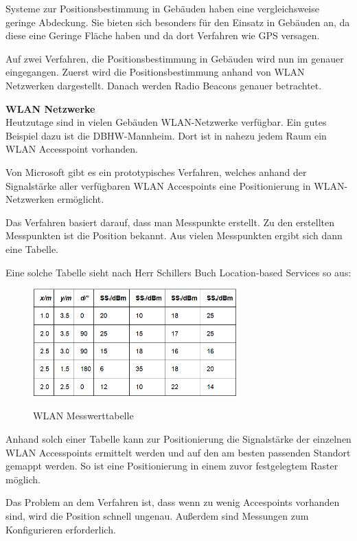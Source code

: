 Systeme zur Positionsbestimmung in Gebäuden haben eine vergleichsweise geringe Abdeckung. Sie bieten sich besonders für den Einsatz in Gebäuden an, da diese eine Geringe Fläche haben und  da dort Verfahren wie GPS versagen. 

Auf zwei Verfahren, die Positionsbestimmung in Gebäuden wird nun im genauer eingegangen. Zuerst wird die Positionsbestimmung anhand von WLAN Netzwerken dargestellt. Danach werden Radio Beacons genauer betrachtet.

\textbf{WLAN Netzwerke}\\
Heutzutage sind in vielen Gebäuden WLAN-Netzwerke verfügbar. Ein gutes Beispiel dazu ist die DBHW-Mannheim. Dort ist in nahezu jedem Raum ein WLAN Accesspoint vorhanden.

Von Microsoft gibt es ein prototypisches Verfahren, welches anhand der Signalstärke aller verfügbaren WLAN Accespoints eine Positionierung in WLAN-Netzwerken ermöglicht. 

Das Verfahren basiert darauf, dass man Messpunkte erstellt. Zu den erstellten Messpunkten ist die Position bekannt. Aus vielen Messpunkten ergibt sich dann eine Tabelle.

\cite[S. 210]{Schiller2004}

Eine solche Tabelle sieht nach Herr Schillers Buch Location-based Services so aus:

\begin{figure}[h]
\centering
\includegraphics[width=0.7\textwidth]{ref/images/WLAN_Tabelle.PNG}
\caption[WLAN Messwerttabelle]{WLAN Messwerttabelle}
\cite[S. 210]{Schiller2004}
\end{figure}

Anhand solch einer Tabelle kann zur Positionierung die Signalstärke der einzelnen WLAN Accesspoints ermittelt werden und auf den am besten passenden Standort gemappt werden. So ist eine Positionierung in einem zuvor festgelegtem Raster möglich.

Das Problem an dem Verfahren ist, dass wenn zu wenig Accespoints vorhanden sind, wird die Position schnell ungenau. Außerdem sind Messungen zum Konfigurieren erforderlich. 

